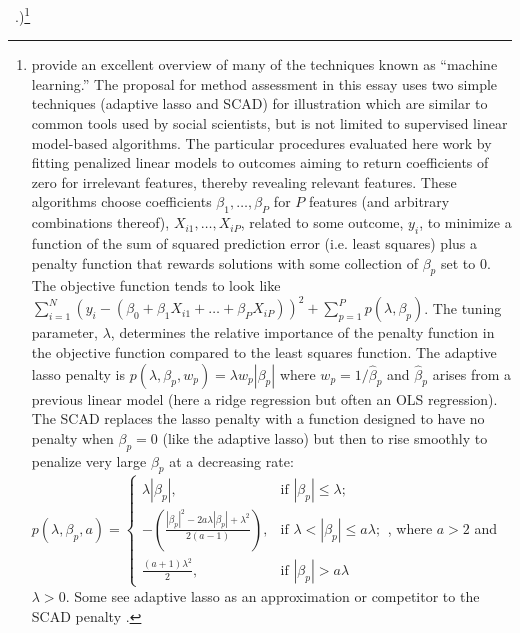 \documentclass[12pt]{article}
\begin{document}
~\citep{hainmueller2012kernel}.)\footnote{\citet{hasttibfried09,james2013introduction} provide an
  excellent overview of many of the techniques known as ``machine learning.''
  The proposal for method assessment in this essay uses two simple techniques
  (adaptive lasso and SCAD) for illustration which are similar to common tools
  used by social scientists, but is not limited to supervised linear model-based
  algorithms. The particular procedures evaluated here work by fitting
  penalized linear models to outcomes aiming to return coefficients of zero
  for irrelevant features, thereby revealing relevant features. These
  algorithms choose coefficients $\beta_1, \ldots, \beta_P$ for $P$ features
  (and arbitrary combinations thereof), $X_{i1}, \ldots, X_{iP}$, related to
  some outcome, $y_i$, to minimize a function of the sum of squared prediction
  error (i.e. least squares) plus a penalty function that rewards solutions
  with some collection of $\beta_p$ set to 0. The objective function tends to
  look like $\sum_{i=1}^N (y_i - ( \beta_0 + \beta_1 X_{i1} + \ldots + \beta_P
  X_{iP}) )^2 + \sum_{p=1}^P p(\lambda,\beta_p)$.  The tuning parameter,
  $\lambda$, determines the relative importance of the penalty function in the
  objective function compared to the least squares function.  The adaptive
  lasso penalty is $p(\lambda,\beta_p,w_p)=\lambda  w_p|\beta_p|$ where
  $w_p=1/\hat{\beta}_p$ and $\hat{\beta}_p$ arises from a previous linear
  model (here a ridge regression but often an OLS regression). The SCAD
  replaces the lasso penalty with a function designed to have no penalty when
  $\beta_p=0$ (like the adaptive lasso) but then to rise smoothly to penalize
  very large $\beta_p$ at a decreasing rate:
  $p(\lambda,\beta_p,a)=\begin{cases} \lambda |\beta_p|, & \text{if }
    |\beta_p|\le \lambda; \\ - \left( \frac{|\beta_p|^2 - 2 a \lambda
	|\beta_p| + \lambda^2}{2 (a-1)} \right), & \text{if } \lambda <
    |\beta_p| \le a \lambda; \\ \frac{(a+1)\lambda^2}{2},  & \text{if }
    |\beta_p| > a \lambda \end{cases}$, where $a > 2$ and $\lambda > 0$.  Some
  see adaptive lasso as an approximation or competitor to the SCAD penalty
  \cite[page 92]{hasttibfried09}. }
 
\end{document}
